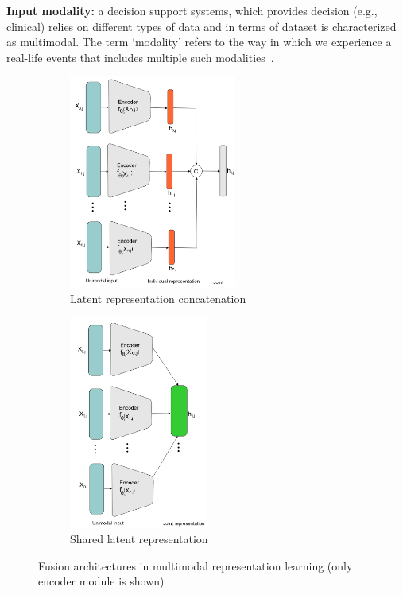 \vspace{-2mm}
\begin{tcolorbox}[colback=white!3!white,colframe=gray!120!black,title=\faBook~Input modality]
    \scriptsize{
        \textbf{Input modality:} a decision support systems, which provides decision (e.g., clinical) relies on different types of data and in terms of dataset is characterized as multimodal. The term `modality' refers to the way in which we experience a real-life events that includes multiple such modalities~\cite{mmsurvey}.
        }
\end{tcolorbox}

\begin{figure}[htp!]
	\centering
	\begin{subfigure}{.48\linewidth}
		\centering
		\includegraphics[width=0.95\linewidth,height=70mm]{images/rl_1.png}
		\caption{Latent representation concatenation}
        \label{fig:lrc_1}
	\end{subfigure}
	\begin{subfigure}{0.48\linewidth}
		\centering
		\includegraphics[width=0.95\linewidth,height=70mm]{images/shared.png}
		\caption{Shared latent representation}
        \label{fig:slr_1}
	\end{subfigure}
	\caption{Fusion architectures in multimodal representation learning (only encoder module is shown)} 
	\label{fig:mm_rL_example}
\end{figure}

